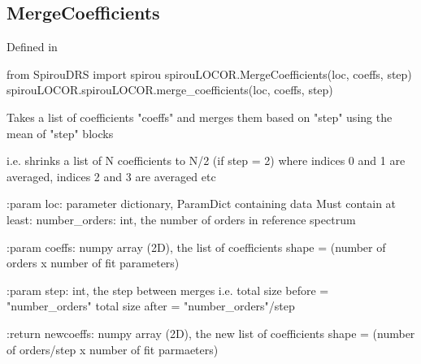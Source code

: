 \begin{minipage}{\textwidth}
\subsection{MergeCoefficients}

Defined in \spirouLOCOR{}

\begin{pythonbox}
from SpirouDRS import spirou
spirouLOCOR.MergeCoefficients(loc, coeffs, step)
spirouLOCOR.spirouLOCOR.merge_coefficients(loc, coeffs, step)
\end{pythonbox}

\begin{pythondocstring}
Takes a list of coefficients "coeffs" and merges them based on "step"
using the mean of "step" blocks

i.e. shrinks a list of N coefficients to N/2 (if step = 2) where
     indices 0 and 1 are averaged, indices 2 and 3 are averaged etc

:param loc: parameter dictionary, ParamDict containing data
        Must contain at least:
            number_orders: int, the number of orders in reference spectrum

:param coeffs: numpy array (2D), the list of coefficients
               shape = (number of orders x number of fit parameters)

:param step: int, the step between merges
             i.e. total size before = "number_orders"
                  total size after = "number_orders"/step

:return newcoeffs: numpy array (2D), the new list of coefficients
            shape = (number of orders/step x number of fit parmaeters)
\end{pythondocstring}
\end{minipage}


